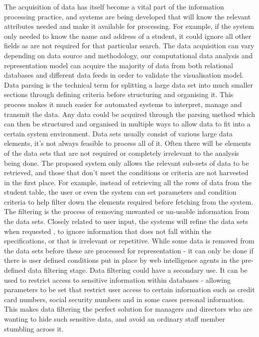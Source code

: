 The acquisition of data has itself become a vital part of the information processing practice, and systems are being developed that will know the relevant attributes needed and make it available for processing. For example, if the system only needed to know the name and address of a student, it could ignore all other fields as are not required for that particular search. The data acquisition can vary depending on data source and methodology, our computational data analysis and representation model can acquire the majority of data from both relational databases and different data feeds in order to validate the visualisation model. Data parsing is the technical term for splitting a large data set into much smaller sections through defining criteria before structuring and organising it. This process makes it much easier for automated systems to interpret, manage and transmit the data. Any data could be acquired through the parsing method which can then be structured and organised in multiple ways to allow data to fit into a certain system environment. Data sets usually consist of various large data elements, it's not always feasible to process all of it. Often there will be elements of the data sets that are not required or completely irrelevant to the analysis being done. The proposed system only allows the relevant sub-sets of data to be retrieved, and those that don't meet the conditions or criteria are not harvested in the first place. For example, instead of retrieving all the rows of data from the student table, the user or even the system can set parameters and condition criteria to help filter down the elements required before fetching  from the system. The filtering is the process of removing unwanted or un-usable information from the data sets. Closely related to user input, the systems will refine the data sets when requested , to ignore information that does not fall within the specifications, or that is irrelevant or repetitive. While some data is removed from the data sets before these are processed for representation - it can only be done if there is user defined conditions put in place by web intelligence agents in the pre-defined data filtering stage. Data filtering could have a secondary use. It can be used to restrict access to sensitive information within databases - allowing parameters to be set that restrict user access to certain information such as credit card numbers, social security numbers and in some cases personal information. This makes data filtering the perfect solution for managers and directors who are wanting to hide such sensitive data, and avoid an ordinary staff member stumbling across it.
 
